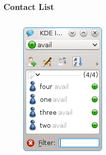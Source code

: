 \documentclass{beamer}
\begin{document}
\begin{frame}[fragile]
    \frametitle{Contact List}

    \begin{columns}
    
    \begin{column}{0.37\textwidth}
    \begin{figure}[htb]
    \includegraphics[width=\textwidth]{ktp_list.png}
    \end{figure}
    \end{column}


\end{columns}
\end{frame}
\end{document}
